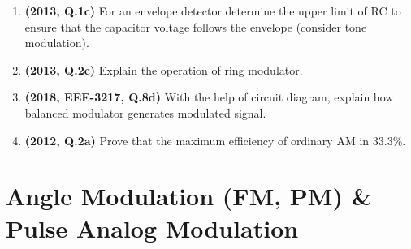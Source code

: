\documentclass[12pt, a4paper]{article}
\begin{document}
\begin{enumerate}
		\item \textbf{(2013, Q.1c)} For an envelope detector determine the upper limit of RC to ensure that the capacitor voltage follows the envelope (consider tone modulation).
		
		\item \textbf{(2013, Q.2c)} Explain the operation of ring modulator.
		\item \textbf{(2018, EEE-3217, Q.8d)} With the help of circuit diagram, explain how balanced modulator generates modulated signal.
		
		\item \textbf{(2012, Q.2a)} Prove that the maximum efficiency of ordinary AM in 33.3\%.
		
	\end{enumerate}
	
	\section{Angle Modulation (FM, PM) \& Pulse Analog Modulation}
\end{document}

